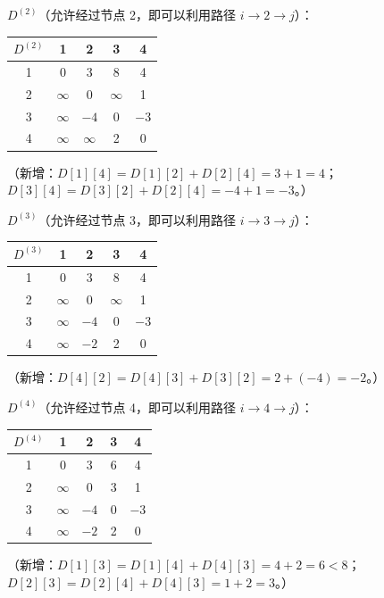 \documentclass[UTF8,openany,12pt]{ctexbook}
\theoremstyle{remark}
\begin{document}
$D^{(2)}$（允许经过节点 2，即可以利用路径 $i\to2\to j$）：
\begin{center}
\begin{tabular}{@{}c|cccc@{}}
\toprule
$D^{(2)}$ & 1 & 2 & 3 & 4 \\
\midrule
1 & 0        & 3        & 8        & 4        \\
2 & $\infty$ & 0        & $\infty$ & 1        \\
3 & $\infty$ & $-4$     & 0        & $-3$     \\
4 & $\infty$ & $\infty$ & 2        & 0        \\
\bottomrule
\end{tabular}
\end{center}

（新增：$D[1][4] = D[1][2]+D[2][4] = 3+1=4$；$D[3][4]=D[3][2]+D[2][4]=-4+1=-3$。）

$D^{(3)}$（允许经过节点 3，即可以利用路径 $i\to3\to j$）：
\begin{center}
\begin{tabular}{@{}c|cccc@{}}
\toprule
$D^{(3)}$ & 1 & 2 & 3 & 4 \\
\midrule
1 & 0        & 3        & 8        & 4        \\
2 & $\infty$ & 0        & $\infty$ & 1        \\
3 & $\infty$ & $-4$     & 0        & $-3$     \\
4 & $\infty$ & $-2$     & 2        & 0        \\
\bottomrule
\end{tabular}
\end{center}

（新增：$D[4][2]=D[4][3]+D[3][2]=2+(-4)=-2$。）

$D^{(4)}$（允许经过节点 4，即可以利用路径 $i\to4\to j$）：
\begin{center}
\begin{tabular}{@{}c|cccc@{}}
\toprule
$D^{(4)}$ & 1 & 2 & 3 & 4 \\
\midrule
1 & 0        & 3        & 6        & 4        \\
2 & $\infty$ & 0        & 3        & 1        \\
3 & $\infty$ & $-4$     & 0        & $-3$     \\
4 & $\infty$ & $-2$     & 2        & 0        \\
\bottomrule
\end{tabular}
\end{center}

（新增：$D[1][3]=D[1][4]+D[4][3]=4+2=6<8$；$D[2][3]=D[2][4]+D[4][3]=1+2=3$。）
\end{document}
